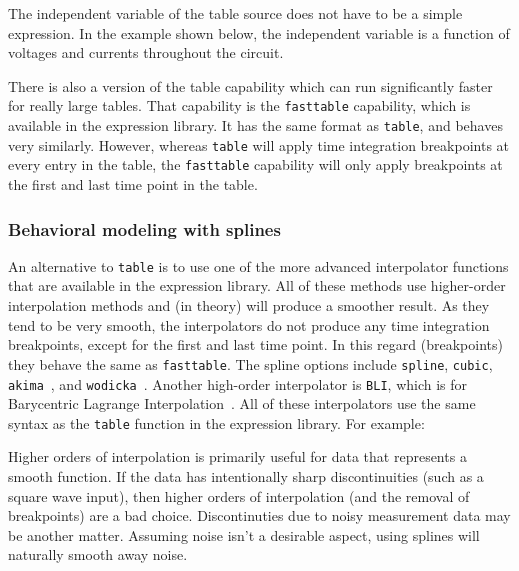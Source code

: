 The independent variable of the table source does not have to be a
simple expression.  In the example shown below, the independent variable is
a function of voltages and currents throughout the circuit.


There is also a version of the table capability which can run significantly faster 
for really large tables.  That capability is the \texttt{fasttable} capability, 
which is available in the \Xyce{} expression library.
It has the same format as \texttt{table}, and behaves very similarly.  However, 
whereas \texttt{table} will apply time integration breakpoints at every entry in 
the table, the \texttt{fasttable} capability will only apply breakpoints at 
the first and last time point in the table.

\subsubsection{Behavioral modeling with splines}

An alternative to \texttt{table} is to use one of the more advanced
interpolator functions that are available in the \Xyce{} expression library.   
All of these methods use higher-order 
interpolation methods and (in theory) will produce a smoother result.  As they 
tend to be very smooth, the interpolators do not produce any time integration 
breakpoints, except for the first and last time point.  In this regard 
(breakpoints) they behave the same as \texttt{fasttable}.
The spline options include \texttt{spline}, \texttt{cubic}, 
\texttt{akima}~\cite{10.1145/321607.321609}, and \texttt{wodicka}~\cite{Engeln1996}. 
Another high-order interpolator is \texttt{BLI}, which is for Barycentric Lagrange 
Interpolation~\cite{Berrut_barycentriclagrange}.  All of these interpolators use the same 
syntax as the \texttt{table} function in the expression library.  For example:


Higher orders of interpolation is primarily useful for data that represents a smooth function.   
If the data has intentionally sharp discontinuities (such as a square wave input), then 
higher orders of interpolation (and the removal of breakpoints) are a bad choice.
Discontinuties due to noisy measurement data may be another matter.  Assuming noise isn't a 
desirable aspect, using splines will naturally smooth away noise.

